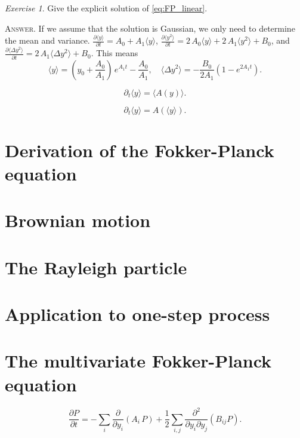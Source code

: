 \documentclass{book}
\numberwithin{equation}{section}
\theoremstyle{plain}
\theoremstyle{definition}
\theoremstyle{remark}
\theoremstyle{BoldStyle}
\newtheorem{exercise}{Exercise}
\numberwithin{exercise}{section}
\newcommand{\answer}[1]{{\color{DarkBlue}\footnotesize \textsc{Answer.} #1}}
\begin{document}
\begin{exercise}
  Give the explicit solution of \eqref{eq:FP_linear}.

  \answer{If we assume that the solution is Gaussian,
    we only need to determine the mean and variance.
    $\frac{ \partial \langle y \rangle } { \partial t}
    = A_0 + A_1 \langle y \rangle$,
    $\frac{ \partial \langle y^2 \rangle } { \partial t}
    = 2 \, A_0 \langle y \rangle + 2 \, A_1 \langle y^2 \rangle + B_0$,
    and
    $\frac{ \partial \langle \Delta y^2 \rangle } { \partial t}
    = 2 \, A_1 \langle \Delta y^2 \rangle + B_0$.
    This means
    $$
    \langle y \rangle = \left(y_0 + \frac{A_0}{A_1} \right) \, e^{A_1 t} - \frac{A_0}{A_1},
    \quad
    \langle \Delta y^2 \rangle = -\frac{B_0}{2 A_1} (1 - e^{2A_1 t}).
    $$
  }
\end{exercise}



\begin{equation}
\partial_t \langle y \rangle
= \langle A(y) \rangle.
\tag{1.7}
\end{equation}

$$
\partial_t \langle y \rangle
= A(\langle y \rangle).
$$

\section{Derivation of the Fokker-Planck equation}

\section{Brownian motion}

\section{The Rayleigh particle}

\section{Application to one-step process}

\section{The multivariate Fokker-Planck equation}

\begin{equation}
\frac{ \partial P } { \partial t }
=
-\sum_i \frac{ \partial } { \partial y_i } (A_i \, P)
+ \frac 1 2
\sum_{i, j} \frac{ \partial^2 } { \partial y_i \partial y_j } (B_{ij} P ).
\tag{6.1}
\end{equation}
\end{document}
